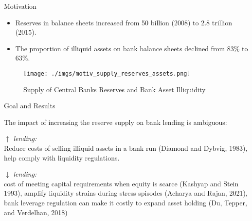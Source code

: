 \documentclass[notes,11pt, aspectratio=169]{beamer}
\newenvironment{wideitemize}{\itemize\addtolength{\itemsep}{10pt}}{\enditemize}
\begin{document}
\begin{frame}{Motivation}
    \vspace{0.5cm}
      \begin{itemize}
        \item  Reserves in balance sheets increased from 50 billion (2008) to 2.8 trillion (2015).
        \item The proportion of illiquid assets on bank balance sheets declined from 83\% to 63\%.
      \end{itemize}
      
        \begin{figure}[t*]
          \centering
    
          \texttt{[image: ./imgs/motiv\_supply\_reserves\_assets.png]}
        \caption{Supply of Central Banks Reserves and Bank Asset Illiquidity}
        \end{figure}
        
      \end{frame}
    
\begin{frame}{Goal and Results}

\begin{wideitemize}
\item The impact of increasing the reserve supply on bank lending is ambiguous: 
\vspace{0.15cm}
\begin{wideitemize}
    \item[$\uparrow$] \textit{lending:} \\Reduce costs of selling illiquid assets in a bank run (Diamond and Dybvig, 1983),  help comply with liquidity regulations.  
    \item[$\downarrow$] \textit{lending:} \\ cost of meeting capital requirements when equity is scarce (Kashyap and Stein 1993),  amplify liquidity strains during stress spisodes (Acharya and Rajan, 2021), bank leverage regulation can make it costly to expand asset holding (Du, Tepper, and Verdelhan, 2018)    
\end{wideitemize}

\end{wideitemize}

\end{frame}
\end{document}

